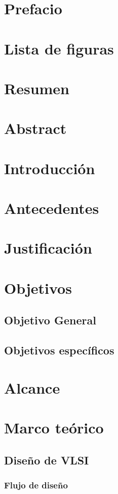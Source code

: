 
\tableofcontents


\section{Prefacio}
\section{Lista de figuras}
\section{Resumen}
\section{Abstract}
\section{Introducción}
\section{Antecedentes}
\section{Justificación}
\section{Objetivos}
\subsection{Objetivo General}
\subsection{Objetivos específicos}
\section{Alcance}
\section{Marco teórico}
\subsection{Diseño de VLSI}
\subsubsection{Flujo de diseño}
